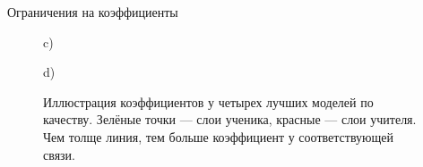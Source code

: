 \documentclass{beamer}
\begin{document}
\begin{frame}{Ограничения на коэффициенты}
\begin{figure}[H]
\begin{minipage}[h]{0.35\linewidth}
             c) \\
        \end{minipage}
        \hfill
        \begin{minipage}[h]{0.35\linewidth}
             d) \\
        \end{minipage}
        \caption{Иллюстрация коэффициентов у четырех лучших моделей по качеству. Зелёные точки --- слои ученика, красные --- слои учителя. Чем толще линия, тем больше коэффициент у соответствующей связи.}
    \end{figure}
\end{frame}

\end{document}
